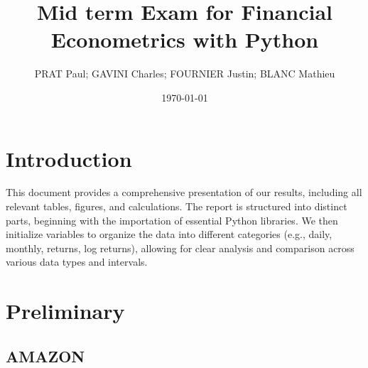 \documentclass{article}
\begin{document}
\title{Mid term Exam for Financial Econometrics with Python}
\author{PRAT Paul; GAVINI Charles; FOURNIER Justin; BLANC Mathieu}
\date{\today}

\maketitle %

\tableofcontents %
\clearpage

\setcounter{page}{1}

\section{Introduction}



This document provides a comprehensive presentation of our results, 
including all relevant tables, figures, and calculations. 
The report is structured into distinct parts, beginning with the importation of essential Python libraries. 
We then initialize variables to organize the data into different categories (e.g., daily, monthly, returns, log returns), 
allowing for clear analysis and comparison across various data types and intervals.


\section{Preliminary}


\subsection{AMAZON}
\end{document}
